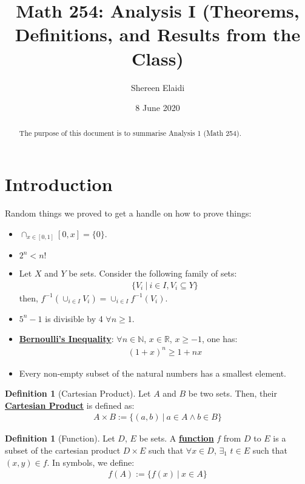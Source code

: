 \documentclass[reqno,11pt]{amsart}
\title{Math 254: Analysis I (Theorems, Definitions, and Results from the Class)}
\author{Shereen Elaidi}
\date{8 June 2020}
\theoremstyle{definition}
\theoremstyle{definition}
\newtheorem{definition}[theorem]{Definition}
\theoremstyle{remark}
\newcommand{\R}{\mathbb{R}}
\newcommand{\dfn}[1]{\underline{\textbf{#1}}}
\begin{document}
\maketitle 
\begin{abstract}
	The purpose of this document is to summarise Analysis 1 (Math 254).
\end{abstract}

\tableofcontents

\section{Introduction}
Random things we proved to get a handle on how to prove things:
\begin{itemize}[noitemsep]
	\item $\cap_{x \in [0, 1] } [0,x] = \{ 0 \}$.
	\item $2^n < n!$ 
	\item Let $X$ and $Y$ be sets. Consider the following family of sets: 
	\begin{align*}
		\{ V_i\ |\ i \in I, V_i \subseteq Y \}
	\end{align*}
	then, $f^{-1} \left( \cup_{i \in I} V_i \right) = \cup_{i \in I} f^{-1}(V_i )$.
	\item $5^n -1$ is divisible by 4 $\forall n \geq 1$. 
	\item \dfn{Bernoulli's Inequality}: $\forall n \in \mathbb{N}$, $x \in \R$, $x \geq -1$, one has: 
	\begin{align}
		(1+x)^n \geq 1 + nx	
	\end{align}
	\item Every non-empty subset of the natural numbers has a smallest element. 
\end{itemize}

\begin{definition}[Cartesian Product] 
	Let $A$ and $B$ be two sets. Then, their \dfn{Cartesian Product} is defined as: 
	\begin{align}
		A \times B 	:= \{ (a,b)\ |\ a \in A \land b \in B \} 
	\end{align}
\end{definition}

\begin{definition}[Function]
	Let $D$, $E$ be sets. A \dfn{function} $f$ from $D$ to $E$ is a subset of the cartesian product $D \times E$ such that $\forall x \in D$, $\exists_1$ $t \in E$ such that $(x,y) \in f$. In symbols, we define: 
	\begin{align}
		f(A) := \{ f(x)\ |\ x \in A \} 	
	\end{align}
\end{definition}
\end{document}
